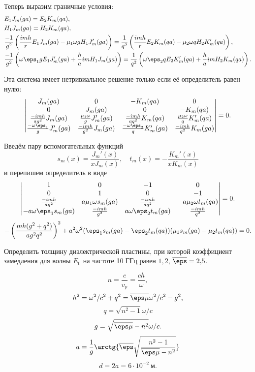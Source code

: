 Теперь выразим граничные условия:
\begin{align*}
	& E_1 J_m(ga) = E_2 K_m(qa),\\
	& H_1 J_m(ga) = H_2 K_m(qa),\\
	& \frac{-1}{g^2}\left(\frac{imh}{r}E_1 J_m(ga) -
	\mu_1\omega g H_1 J_m'(ga)\right) =
	\frac{1}{q^2}\left(\frac{imh}{r}E_2 K_m(qa) -
	\mu_2\omega q H_2 K_m'(qa)\right),\\
	& \frac{-1}{g^2}\left(\omega\eps_1 g E_1 J_m'(ga) + \frac{h}{a}im H_1 J_m(ga)\right) = \frac{1}{q^2}\left(\omega\eps_2 q E_2 K_m'(qa) + \frac{h}{a}im H_2 K_m(qa)\right).
\end{align*}

Эта система имеет нетривиальное решение только если её определитель равен нулю:
\[
	\begin{vmatrix}
		J_m(ga) & 0 & -K_m(qa) & 0 \\
		0 & J_m(ga) & 0 & -K_m(qa) \\
		\frac{-imh}{ag^2}J_m(ga) & \frac{\mu_1\omega}{g}J_m'(ga) & \frac{-imh}{aq^2}K_m(qa) & \frac{\mu_2\omega}{q}K_m'(qa)\\
		\frac{-\omega\eps_1}{g}J_m'(ga) & \frac{-imh}{g^2}J_m(ga) & \frac{-\omega\eps_2}{q}K_m'(ga) & \frac{-imh}{q^2}K_m(ga)\\
	\end{vmatrix} = 0.
\]

Введём пару вспомогательных функций
\[
	s_m(x) = \frac{J_m'(x)}{xJ_m(x)},\quad
	t_m(x) = -\frac{K_m'(x)}{xK_m(x)}
\]
и перепишем определитель в виде
\[
	\begin{vmatrix}
		1 & 0 & -1 & 0 \\
		0 & 1 & 0 & -1 \\
		\frac{-imh}{ag^2} & a\mu_1\omega s_m(ga) & \frac{-imh}{aq^2} & -a\mu_2\omega t_m(qa)\\
		-a\omega\eps_1 s_m(ga) & \frac{-imh}{g^2} & a\omega\eps_2t_m(ga) & \frac{-imh}{q^2}\\
	\end{vmatrix} = 0.
\]
\[
	-\left(\frac{mh(g^2 + q^2)}{ag^2q^2}\right)^2 + a^2\omega^2(\eps_1s_m(ga) - \eps_2t_m(qa))(\mu_1 s_m(ga) - \mu_2 t_m(qa)) = 0.
\]

\begin{problem}
Определить толщину диэлектрической пластины, при которой коэффициент замедления для волны \(E_0\) на частоте 10 ГГц равен \( 1,\!2 \), \(\overline{\eps} = 2,\!5\).
\end{problem}

\[
	n = \frac{c}{v_p} = \frac{ch}{\omega},
\]
\[
	h^2 = \omega^2/c^2 + q^2 = \overline{\eps\mu}\omega^2/c^2 - g^2,
\]
\[
	q = \sqrt{n^2 - 1}\omega/ c
\]
\[
	g = \sqrt{\overline{\eps\mu} - n^2}\omega / c.
\]
\[
	a = \frac{1}{g}\arctg{\overline{\eps}\sqrt{\frac{n^2-1}{\overline{\eps\mu} - n^2}}}
\]
\[
	d = 2a = 6\cdot10^{-2}~\text{м}.
\]
